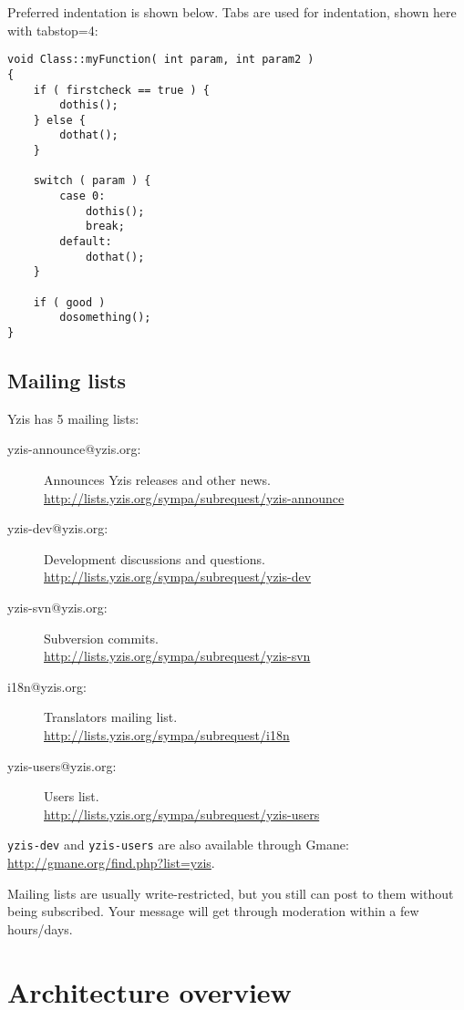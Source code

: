 \documentclass[a4paper,12pt]{report}
\begin{document}
Preferred indentation is shown below. Tabs are used for indentation, shown here
with tabstop=4:
\begin{verbatim}
void Class::myFunction( int param, int param2 )
{
    if ( firstcheck == true ) {
        dothis();
    } else {
        dothat();
    }
    
    switch ( param ) {
        case 0:
            dothis();
            break;
        default:
            dothat();
    }
    
    if ( good )
        dosomething();
}
\end{verbatim}

\section{Mailing lists}

Yzis has 5 mailing lists:
\begin{description}
    \item[yzis-announce@yzis.org:] Announces Yzis releases and other news.\\
        \url{http://lists.yzis.org/sympa/subrequest/yzis-announce}
    \item[yzis-dev@yzis.org:] Development discussions and questions.\\
        \url{http://lists.yzis.org/sympa/subrequest/yzis-dev}
    \item[yzis-svn@yzis.org:] Subversion commits.\\
        \url{http://lists.yzis.org/sympa/subrequest/yzis-svn}
    \item[i18n@yzis.org:] Translators mailing list.\\
        \url{http://lists.yzis.org/sympa/subrequest/i18n}
    \item[yzis-users@yzis.org:] Users list.\\
        \url{http://lists.yzis.org/sympa/subrequest/yzis-users}
\end{description}

\texttt{yzis-dev} and \texttt{yzis-users} are also available through Gmane:
\url{http://gmane.org/find.php?list=yzis}.

Mailing lists are usually write-restricted, but you still can post to them without being subscribed. Your message will get through moderation within a few hours/days.

\chapter{Architecture overview}
\end{document}
